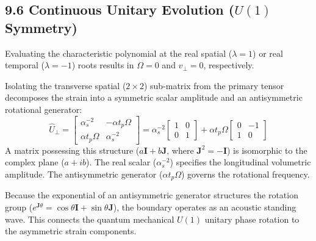 
\subsection*{9.6 Continuous Unitary Evolution ($U(1)$ Symmetry)} 
Evaluating the characteristic polynomial at the real spatial ($\lambda = 1$) or real temporal ($\lambda = -1$) roots results in $\Omega = 0$ and $v_\perp = 0$, respectively. 

Isolating the transverse spatial ($2 \times 2$) sub-matrix from the primary tensor decomposes the strain into a symmetric scalar amplitude and an antisymmetric rotational generator: 
\begin{equation} 
    \hat{U}_{\perp} = \begin{bmatrix} \alpha_s^{-2} & -\alpha t_p \Omega \\ \alpha t_p \Omega & \alpha_s^{-2} \end{bmatrix} = \alpha_s^{-2} \begin{bmatrix} 1 & 0 \\ 0 & 1 \end{bmatrix} + \alpha t_p \Omega \begin{bmatrix} 0 & -1 \\ 1 & 0 \end{bmatrix} 
\end{equation} 
A matrix possessing this structure ($a\mathbf{I} + b\mathbf{J}$, where $\mathbf{J}^2 = -\mathbf{I}$) is isomorphic to the complex plane ($a + ib$). The real scalar ($\alpha_s^{-2}$) specifies the longitudinal volumetric amplitude. The antisymmetric generator ($\alpha t_p \Omega$) governs the rotational frequency. 

Because the exponential of an antisymmetric generator structures the rotation group ($e^{\mathbf{J}\theta} = \cos\theta \mathbf{I} + \sin\theta \mathbf{J}$), the boundary operates as an acoustic standing wave. This connects the quantum mechanical $U(1)$ unitary phase rotation to the asymmetric strain components. 

